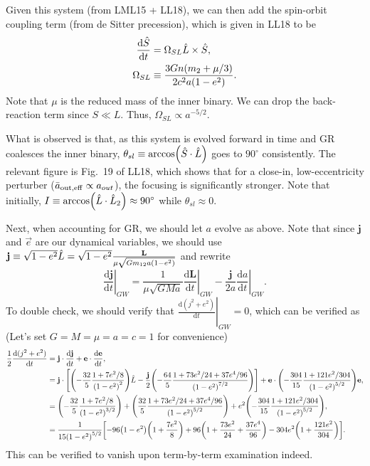 \documentclass[11pt,
        usenames, %
        dvipsnames %
    ]{article}
\newcommand*{\rd}[2]{\frac{\mathrm{d}#1}{\mathrm{d}#2}}
\newcommand*{\bm}[1]{\boldsymbol{\mathbf{#1}}}
\newcommand*{\at}[1]{\left.#1\right|}
\DeclarePairedDelimiter\p{\lparen}{\rparen}
\DeclarePairedDelimiter\s{\lbrack}{\rbrack}
\begin{document}
Given this system (from LML15 + LL18), we can then add the spin-orbit coupling
term (from de Sitter precession), which is given in LL18 to be
\begin{align}
    \rd{\hat{S}}{t} &= \Omega_{SL}\hat{L} \times \hat{S},\\
    \Omega_{SL} &\equiv \frac{3Gn\p*{m_2 + \mu/3}}{2c^2a\p*{1 - e^2}}.
\end{align}
Note that $\mu$ is the reduced mass of the inner binary. We can drop the
back-reaction term since $S \ll L$. Thus, $\Omega_{SL} \propto a^{-5/2}$.

What is observed is that, as this system is evolved forward in time and GR
coalesces the inner binary, $\theta_{sl} \equiv \arccos\p*{\hat{S} \cdot
\hat{L}}$ goes to $90^\circ$ consistently. The relevant figure is Fig.~19 of
LL18, which shows that for a close-in, low-eccentricity perturber ($\bar{a}_{\rm
out, eff} \propto a_{out}$), the focusing is significantly stronger. Note that
initially, $I \equiv \arccos\p*{\hat{L} \cdot \hat{L}_2} \approx 90^\circ$ while
$\theta_{sl} \approx 0$.

Next, when accounting for GR, we should let $a$ evolve as above. Note that since
$\bm{j}$ and $\vec{e}$ are our dynamical variables, we should use $\bm{j} \equiv
\sqrt{1 - e^2} \hat{L} = \sqrt{1 - e^2}\frac{\bm{L}}{\mu \sqrt{Gm_{12}a\p*{1 -
e^2}}}$ and rewrite
\begin{equation}
    \at{\rd{\bm{j}}{t}}_{GW} = \frac{1}{\mu\sqrt{GMa}}\at{\rd{\bm{L}}{t}}_{GW}
        - \frac{\bm{j}}{2a}\at{\rd{a}{t}}_{GW}.
\end{equation}
To double check, we should verify that $\at{\rd{(j^2 + e^2)}{t}}_{GW} = 0$,
which can be verified as (Let's set $G = M = \mu = a = c = 1$ for convenience)
\begin{align}
    \frac{1}{2}\rd{(j^2 + e^2)}{t}
        &= \bm{j} \cdot \rd{\bm{j}}{t} + \bm{e} \cdot \rd{\bm{e}}{t},\\
        &= \bm{j} \cdot \s*{
            \p*{-\frac{32}{5}\frac{1 + 7e^2/8}{\p*{1 - e^2}^2}}\hat{L}
                - \frac{\bm{j}}{2}\p*{-\frac{64}{5}
                    \frac{1 + 73e^2/24 + 37e^4/96}{\p*{1 - e^2}^{7/2}}}}
            + \bm{e} \cdot
                \p*{-\frac{304}{15}\frac{1 + 121e^2/304}{\p*{1 - e^2}^{5/2}}}
                \bm{e},\\
        &= \p*{-\frac{32}{5}\frac{1 + 7e^2/8}{\p*{1 - e^2}^{3/2}}}
                + \p*{\frac{32}{5}
                    \frac{1 + 73e^2/24 + 37e^4/96}{\p*{1 - e^2}^{5/2}}}
            + e^2 \p*{-\frac{304}{15}\frac{1 + 121e^2/304}{\p*{1 - e^2}^{5/2}}}
                ,\\
        &= \frac{1}{15\p*{1 - e^2}^{5/2}}\s*{
            -96\p*{1 - e^2}\p*{1 + \frac{7e^2}{8}}
                + 96\p*{1 + \frac{73e^2}{24} + \frac{37e^4}{96}}
                - 304e^2\p*{1 + \frac{121e^2}{304}}}.
\end{align}
This can be verified to vanish upon term-by-term examination indeed.
\end{document}
